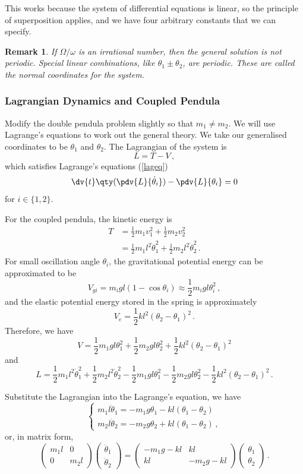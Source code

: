 \documentclass{article}
\theoremstyle{plain}\theoremheaderfont{\normalfont\itshape}\theorembodyfont{\rmfamily}\theoremseparator{.}\newtheorem*{rem}{Remark}\newtheorem*{ex}{Example}\newtheorem*{proof}{Proof}\newtheorem*{altp}{Alternative proof}
\theoremstyle{plain}\theoremheaderfont{\normalfont\bfseries}\theorembodyfont{\rmfamily}\theoremseparator{.}\newtheorem{thm}{Theorem}[section]\newtheorem{lem}[thm]{Lemma}\newtheorem{prop}[thm]{Proposition}\newtheorem*{cor}{Corollary}\newtheorem{defn}[thm]{Definition}\newtheorem{clm}[thm]{Claim}\newtheorem{clminproof}{Claim}
\theoremstyle{break}\theoremheaderfont{\normalfont\itshape}\theorembodyfont{\rmfamily}\theoremseparator{.\medskip}\newtheorem*{proofskip}{Proof}\newtheorem*{exs}{Examples}\newtheorem*{rems}{Remarks}
\theoremstyle{break}\theoremheaderfont{\normalfont\bfseries}\theorembodyfont{\rmfamily}\theoremseparator{.\medskip}\newtheorem{lemskip}[thm]{Lemma}\newtheorem{defnskip}[thm]{Definition}\newtheorem{propskip}[thm]{Proposition}\newtheorem{thmskip}[thm]{Theorem}
\numberwithin{equation}{section}
\begin{document}
	This works because the system of differential equations is linear, so the principle of superposition applies, and we have four arbitrary constants that we can specify.
	\begin{rem}
		If \(\Omega/\omega\) is an irrational number, then the general solution is not periodic. Special linear combinations, like \(\theta_1\pm\theta_2\), are periodic. These are called the \textit{normal coordinates} for the system.
	\end{rem}
	\subsubsection{Lagrangian Dynamics and Coupled Pendula}
	Modify the double pendula problem slightly so that \(m_1\ne m_2\). We will use Lagrange's equations to work out the general theory. We take our generalised coordinates to be \(\theta_1\) and \(\theta_2\). The Lagrangian of the system is
	\[L=T-V\,,\]
	which satisfies Lagrange's equations (\cref{lageq})
	\[\dv{t}\qty(\pdv{L}{\dot{\theta}_i})-\pdv{L}{\theta_i}=0\]
	for \(i\in\{1,2\}\).

	For the coupled pendula, the kinetic energy is
	\begin{align*}
		T&=\frac{1}{2}m_1v_1^2+\frac{1}{2}m_2v_2^2\\
		&=\frac{1}{2}m_1l^2\dot{\theta}_1^2+\frac{1}{2}m_2l^2\dot{\theta}_2^2\,.
	\end{align*}
	For small oscillation angle \(\theta_i\), the gravitational potential energy can be approximated to be
	\[V_{gi}=m_igl(1-\cos\theta_i)\approx\frac{1}{2}m_i gl\theta_i^2\,,\]
	and the elastic potential energy stored in the spring is approximately
	\[V_{e}=\frac{1}{2}kl^2(\theta_2-\theta_1)^2\,.\]
	Therefore, we have
	\[V=\frac{1}{2}m_1gl\theta_1^2+\frac{1}{2}m_2gl\theta_2^2+\frac{1}{2}kl^2(\theta_2-\theta_1)^2\]
	and
	\[L=\frac{1}{2}m_1l^2\dot{\theta}_1^2+\frac{1}{2}m_2l^2\dot{\theta}_2^2-\frac{1}{2}m_1gl\theta_1^2-\frac{1}{2}m_2gl\theta_2^2-\frac{1}{2}kl^2(\theta_2-\theta_1)^2\,.\]

	Substitute the Lagrangian into the Lagrange's equation, we have
	\[\begin{cases}
		m_1l\ddot{\theta}_1=-m_1g\theta_1-kl(\theta_1-\theta_2)\\
		m_2l\ddot{\theta}_2=-m_2g\theta_2+kl(\theta_1-\theta_2)\,,
	\end{cases}\]
	or, in matrix form,
	\begin{equation}\tag{\(\dagger\)}
		\begin{pmatrix}
			m_1l & 0\\
			0 & m_2l
		\end{pmatrix}\begin{pmatrix}
			\ddot{\theta}_1 \\ \ddot{\theta}_2
		\end{pmatrix}=\begin{pmatrix}
			-m_1g-kl & kl \\
			kl & -m_2g-kl
		\end{pmatrix}\begin{pmatrix}
			\theta_1 \\ \theta_2
		\end{pmatrix}\,.
	\end{equation}
	
\end{document}
